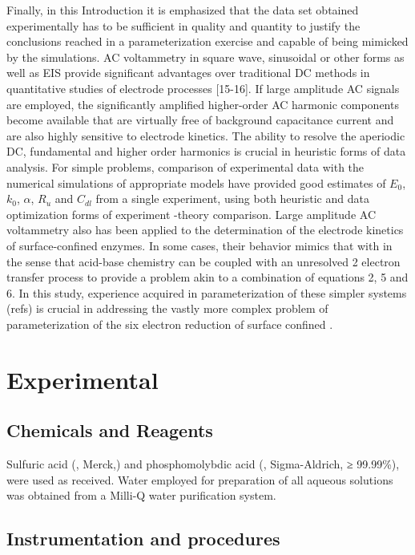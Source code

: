 \documentclass[a4paper, 12pt]{article}
\begin{document}
Finally, in this Introduction it is emphasized that the data set obtained 
experimentally has to be sufficient in quality and quantity to justify the 
conclusions reached in a parameterization exercise and capable of being mimicked 
by the simulations. AC voltammetry in square wave, sinusoidal or other forms as 
well as EIS provide significant advantages over traditional DC methods in 
quantitative studies of electrode processes [15-16]. If large amplitude AC 
signals are employed, the significantly amplified higher-order AC harmonic 
components become available that are virtually free of background capacitance 
current and are also highly sensitive to electrode kinetics. The ability to 
resolve the aperiodic DC, fundamental and higher order harmonics is crucial in 
heuristic forms of data analysis. For simple problems, comparison of 
experimental data with the numerical simulations of appropriate models have 
provided  good estimates of $E_0$,  $k_0$, $\alpha$, $R_u$ and $C_{dl}$ from a 
single experiment, using  both heuristic and data optimization forms of 
experiment -theory comparison. Large amplitude AC voltammetry also has been 
applied to the determination of the electrode kinetics of surface-confined 
enzymes. In some cases, their behavior  mimics that   with    
in the sense  that  acid-base chemistry   can be coupled with an unresolved 2 
electron transfer process to provide a problem  akin to a combination of 
equations 2, 5 and 6. In this study, experience acquired in parameterization of 
these simpler systems (refs) is crucial in addressing the vastly more complex 
problem of parameterization of the six electron reduction of surface confined 
.

\section{Experimental}

\subsection{Chemicals and Reagents}


Sulfuric acid (, Merck,) and phosphomolybdic acid (, 
Sigma-Aldrich, ≥ 99.99\%), were used as received. Water employed for preparation 
of all aqueous solutions was obtained from a Milli-Q water purification system.

\subsection{Instrumentation and procedures}
\end{document}
